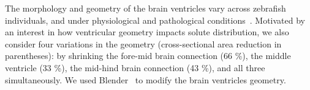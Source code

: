 \documentclass{WileyMSP-template}
\begin{document}
The morphology and geometry of the brain ventricles vary across zebrafish
individuals, and under physiological and pathological conditions~\cite{Olstad2019CiliaryDevelopment}. 
Motivated by an interest in how ventricular geometry impacts solute distribution,
we also consider four variations in the geometry (cross-sectional area
reduction in parentheses):
by shrinking the fore-mid brain connection (66 \%), 
the middle ventricle (33 \%), the mid-hind brain connection (43 \%), and all three simultaneously.
We used Blender~\cite{Community2018BlenderPackage} to modify the brain ventricles geometry.
\end{document}
